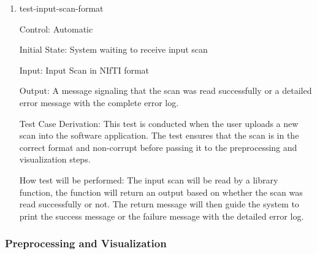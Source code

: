 \documentclass[12pt, titlepage]{article}
\begin{document}
\begin{enumerate}

  \item{test-input-scan-format}

        Control: Automatic

        Initial State: System waiting to receive input scan

        Input: Input Scan in NIfTI format

        Output: A message signaling that the scan was read successfully or a detailed error message
        with the complete error log.

        Test Case Derivation: This test is conducted when the user uploads a new scan into the software application.
        The test ensures that the scan is in the correct format and non-corrupt before passing it to the preprocessing and
        visualization steps.

        How test will be performed: The input scan will be read by a library function, the function will return an output
        based on whether the scan was read successfully or not. The return message will then guide the system to print the success message
        or the failure message with the detailed error log.

\end{enumerate}

\subsubsection{Preprocessing and Visualization} \label{section5.2}
\end{document}
